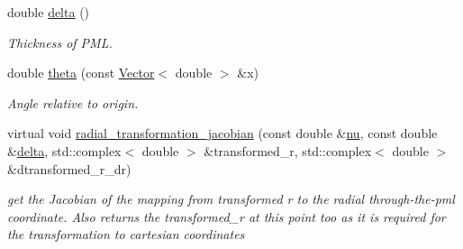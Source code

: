 \begin{DoxyCompactItemize}
double \hyperlink{classoomph_1_1AnnularFromCartesianPMLElement_a9cf84a8abb2f74bf71b6dbf4cc3958f1}{delta} ()
\begin{DoxyCompactList}\small\item\em Thickness of P\+ML. \end{DoxyCompactList}\item 
double \hyperlink{classoomph_1_1AnnularFromCartesianPMLElement_a7c681a8ec4f83f5e9989a8d2fee4de91}{theta} (const \hyperlink{classoomph_1_1Vector}{Vector}$<$ double $>$ \&x)
\begin{DoxyCompactList}\small\item\em Angle relative to origin. \end{DoxyCompactList}\item 
virtual void \hyperlink{classoomph_1_1AnnularFromCartesianPMLElement_a4095e343d2a36dac4e1d5f69402a4ff3}{radial\+\_\+transformation\+\_\+jacobian} (const double \&\hyperlink{classoomph_1_1AnnularFromCartesianPMLElement_acac12e9f2f6df3e9edebb7747ce4fab8}{nu}, const double \&\hyperlink{classoomph_1_1AnnularFromCartesianPMLElement_a9cf84a8abb2f74bf71b6dbf4cc3958f1}{delta}, std\+::complex$<$ double $>$ \&transformed\+\_\+r, std\+::complex$<$ double $>$ \&dtransformed\+\_\+r\+\_\+dr)
\begin{DoxyCompactList}\small\item\em get the Jacobian of the mapping from transformed r to the radial through-\/the-\/pml coordinate. Also returns the transformed\+\_\+r at this point too as it is required for the transformation to cartesian coordinates \end{DoxyCompactList}\end{DoxyCompactItemize}
